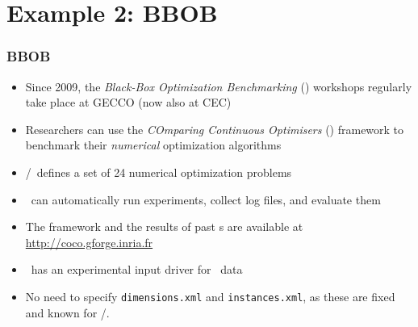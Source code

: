 %
\section{Example 2: BBOB}%
%
\xdef\bbobExamplePath{../../examples/bbob}%
%
\begin{frame}[t]%
\frametitle{BBOB}%
\begin{itemize}%
\item Since 2009, the \emph{Black-Box Optimization Benchmarking} (\bbob) workshops\scitep{\bbobReferences} regularly take place at GECCO (now also at CEC)%
\item<2-> Researchers can use the \emph{COmparing Continuous Optimisers} (\coco) framework to benchmark their \emph{numerical} optimization algorithms%
\item<3-> \coco/\bbob\ defines a set of 24 numerical optimization problems%
%
\item<8-> \coco\ can automatically run experiments, collect log files, and evaluate them%
\item<9-> The framework and the results of past {\bbob}s are available at \url{http://coco.gforge.inria.fr}%
\item<10-> \optimizationBenchmarking\ has an \alert{experimental} input driver for \coco\ data%
\item<11-> No need to specify \texttt{dimensions.xml} and \texttt{instances.xml}, as these are fixed and known for \coco/\bbob.%
\end{itemize}%
%
%
%
%
%
%
%

\end{frame}
